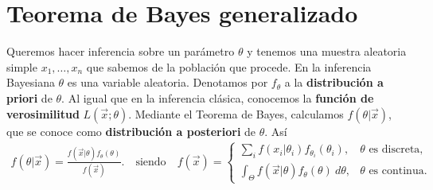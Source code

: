 \section{Teorema de Bayes generalizado}
\noindent Queremos hacer inferencia sobre un parámetro $\theta$ y tenemos una muestra aleatoria simple $x_1,\ldots,x_n$ que sabemos de la población que procede. En la inferencia Bayesiana $\theta$ es una variable aleatoria. Denotamos por $f_{\theta}$ a la \textbf{distribución a priori} de $\theta$. Al igual que en la inferencia clásica, conocemos la \textbf{función de verosimilitud} $L(\vec{x};\theta)$. Mediante el Teorema de Bayes, calculamos $f(\theta | \vec{x})$, que se conoce como \textbf{distribución a posteriori} de $\theta$. Así
\begin{align*}
    f(\theta | \vec{x}) = \frac{f(\vec{x} | \theta) f_{\theta}(\theta)}{f(\vec{x})}. \quad \text{siendo} \quad f(\vec{x}) = \begin{cases}
        \sum_i f(x_i | \theta_i)f_{\theta_i}(\theta_i), & \theta \text{ es discreta}, \\
        \int_{\Theta} f(\vec{x} | \theta) f_{\theta}(\theta) \ d\theta, & \theta \text{ es continua}.
    \end{cases}
\end{align*}

